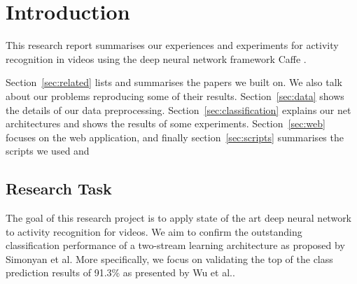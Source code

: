 \section{Introduction}
\label{sec:introduction}

This research report summarises our experiences and experiments for activity recognition in videos using the deep neural network framework Caffe \cite{jia2014caffe}.

Section~\ref{sec:related} lists and summarises the papers we built on.
We also talk about our problems reproducing some of their results.
Section~\ref{sec:data} shows the details of our data preprocessing.
Section~\ref{sec:classification} explains our net architectures and shows the results of some experiments.
Section~\ref{sec:web} focuses on the web application, and finally section~\ref{sec:scripts} summarises the scripts we used and 

\subsection{Research Task}
The goal of this research project is to apply state of the art deep neural network to activity recognition for videos. We aim to confirm the outstanding classification performance of a two-stream learning architecture\cite{simonyan2014two} as proposed by Simonyan et al. More specifically, we focus on validating the top of the class prediction results of 91.3\% as presented by Wu et al.\cite{wu2015modeling}.
